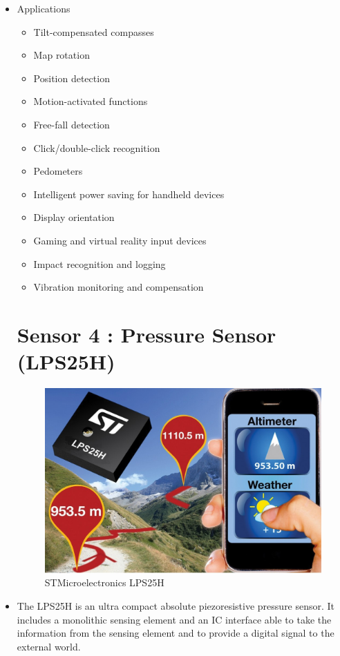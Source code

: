 \documentclass[11pt,a4paper]{article}
\begin{document}
\begin{itemize}
\item Applications
\begin{itemize}

\item Tilt-compensated compasses
\item Map rotation
\item Position detection
\item Motion-activated functions
\item Free-fall detection
\item Click/double-click recognition
\item Pedometers
\item Intelligent power saving for handheld devices
\item Display orientation
\item Gaming and virtual reality input devices
\item Impact recognition and logging
\item Vibration monitoring and compensation

\end{itemize}

\newpage
\section{Sensor 4 : Pressure Sensor (LPS25H)}
\begin{figure}[h]
    \centering
	\includegraphics[scale=0.25]{LPS25H.jpg}
	\caption {STMicroelectronics LPS25H}
	\end{figure}

\item The LPS25H is an ultra compact absolute piezoresistive pressure sensor. It includes a
monolithic sensing element and an IC interface
able to take the information from the sensing
element and to provide a digital signal to the
external world.


\end{itemize}
\end{document}
